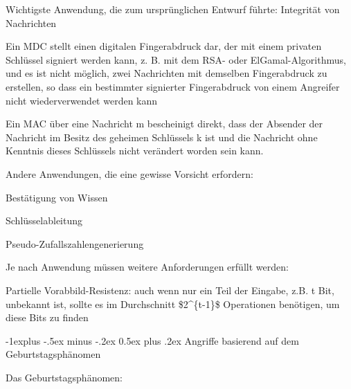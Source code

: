 \documentclass[a4paper]{article}
\makeatletter
\renewcommand{\subsection}{\@startsection{subsection}{2}{0mm}%
 {-1explus -.5ex minus -.2ex}%
 {0.5ex plus .2ex}%
 {\normalfont\normalsize\bfseries}}
\makeatother
\begin{document}
\begin{multicols}{3}
      \begin{itemize*}
            \item
            Wichtigste Anwendung, die zum ursprünglichen Entwurf führte:
            Integrität von Nachrichten

            \begin{itemize*}
                  \item Ein MDC stellt einen digitalen Fingerabdruck dar, der mit einem privaten Schlüssel signiert werden kann, z. B. mit dem RSA- oder ElGamal-Algorithmus, und es ist nicht möglich, zwei Nachrichten mit demselben Fingerabdruck zu erstellen, so dass ein bestimmter signierter Fingerabdruck von einem Angreifer nicht wiederverwendet werden kann
                  \item Ein MAC über eine Nachricht m bescheinigt direkt, dass der Absender der Nachricht im Besitz des geheimen Schlüssels k ist und die Nachricht ohne Kenntnis dieses Schlüssels nicht verändert worden sein kann.
            \end{itemize*}
            \item
            Andere Anwendungen, die eine gewisse Vorsicht erfordern:

            \begin{itemize*}
                  \item Bestätigung von Wissen
                  \item Schlüsselableitung
                  \item Pseudo-Zufallszahlengenerierung
            \end{itemize*}
            \item
            Je nach Anwendung müssen weitere Anforderungen erfüllt werden:

            \begin{itemize*}
                  \item Partielle Vorabbild-Resistenz: auch wenn nur ein Teil der Eingabe, z.B. t Bit, unbekannt ist, sollte es im Durchschnitt \$2\^{}\{t-1\}\$ Operationen benötigen, um diese Bits zu finden
            \end{itemize*}
      \end{itemize*}


      \subsection{Angriffe basierend auf dem
            Geburtstagsphänomen}

      \begin{itemize*}
            \item
            Das Geburtstagsphänomen:


\end{itemize*}
\end{multicols}
\end{document}

